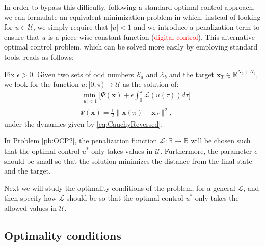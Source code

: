 In order to bypass this difficulty, following a standard optimal control approach, we can formulate an equivalent minimization problem in which, instead of looking for $u\in\mathcal U$, we simply require that $|u|<1$ and we introduce a penalization term to ensure that $u$ is a piece-wise constant function (\textcolor{red}{digital control}). This alternative optimal control problem, which can be solved more easily by employing standard tools, reads as follows:
\newline
\begin{problem}\label{pb:OCP2}
Fix $\epsilon>0$. Given two sets of odd numbers $\mathcal E_a $ and $\mathcal E_b $ and the target $\bm{x}_T \in \mathbb {R}^{N_a + N_b}$, we look for the  function $u:[0,\pi)\to\mathcal U$ as the solution of:
\begin{align*}
	&\min_{|u|<1} \Bigg[\Psi(\bm{x}) + \epsilon \int_0^{\pi} \mathcal{L}(u(\tau)) d\tau \Bigg]  
	\\[5pt]
	&\Psi(\bm{x}) = \frac 12 \|\bm{x}(\pi) - \bm{x}_T\|^2,
\end{align*}
under the dynamics given by \eqref{eq:CauchyReversed}.
\end{problem}

In Problem \ref{pb:OCP2}, the penalization function $\mathcal L: \mathbb{R} \rightarrow \mathbb{R}$ will be chosen such that the optimal control $u^*$ only takes values in $\mathcal U$. Furthermore, the parameter $\epsilon$ should be small so that the solution minimizes the distance from the final state and the target.

Next we will study the optimality conditions of the problem, for a general $\mathcal L$, and then specify how $\mathcal L$ should be so that the optimal control $u^*$ only takes the allowed values in $\mathcal U$.

\subsection{Optimality conditions}

